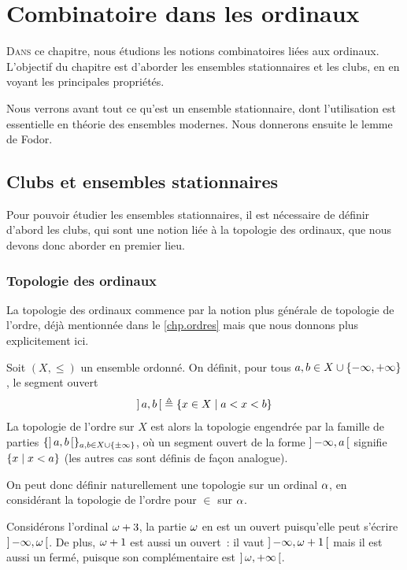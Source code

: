 \chapter{Combinatoire dans les ordinaux}
\label{chp.combi}

\minitoc

\lettrine{D}{ans} ce chapitre, nous étudions les notions combinatoires liées aux
ordinaux. L'objectif du chapitre est d'aborder les ensembles stationnaires et
les clubs, en en voyant les principales propriétés.

Nous verrons avant tout ce qu'est un ensemble stationnaire, dont l'utilisation
est essentielle en théorie des ensembles modernes. Nous donnerons ensuite le
lemme de Fodor.

\section{Clubs et ensembles stationnaires}

Pour pouvoir étudier les ensembles stationnaires, il est nécessaire de définir
d'abord les clubs, qui sont une notion liée à la topologie des ordinaux, que
nous devons donc aborder en premier lieu.

\subsection{Topologie des ordinaux}

La topologie des ordinaux commence par la notion plus générale de topologie de
l'ordre, déjà mentionnée dans le \cref{chp.ordres} mais que nous donnons
plus explicitement ici.

\begin{definition}
  Soit $(X,\leq)$ un ensemble ordonné. On définit, pour tous
  $a,b\in X\cup\{\mathord{-}\infty,\mathord{+}\infty\}$, le segment ouvert
  \[\mathord{\left]\,a,b\,\right[} \triangleq \left\{ x \in X \;\middle\vert\; a < x < b \right\}\]
  La topologie de l'ordre sur $X$ est alors la topologie engendrée par la
  famille de parties $\{\mathord{\left]\,a,b\,\right[}\}_{a,b\in X\cup\{\pm\infty\}}$, où un segment
  ouvert de la forme $\mathord{\left]\,\mathord{-}\infty,a\,\right[}$ signifie $\left\{ x \;\middle\vert\; x < a \right\}$ (les
  autres cas sont définis de façon analogue).
\end{definition}

On peut donc définir naturellement une topologie sur un ordinal $\alpha$, en
considérant la topologie de l'ordre pour $\in$ sur $\alpha$.

\begin{example}
  Considérons l'ordinal $\omega + 3$, la partie $\omega$ en est un ouvert
  puisqu'elle peut s'écrire $\mathord{\left]\,\mathord{-}\infty,\omega\,\right[}$. De plus, $\omega + 1$ est aussi
  un ouvert~: il vaut $\mathord{\left]\,\mathord{-}\infty,\omega+1\,\right[}$ mais il est aussi un fermé,
  puisque son complémentaire est $\mathord{\left]\,\omega,\mathord{+}\infty\,\right[}$.
\end{example}

